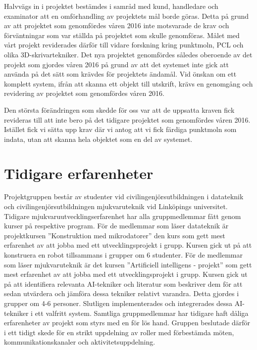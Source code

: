 Halvvägs in i projektet bestämdes i samråd med kund, handledare och examinator att en omförhandling av projektets mål borde göras. Detta på grund av att projektet som genomfördes våren 2016 inte motsvarade de krav och förväntningar som var ställda på projektet som skulle genomföras. Målet med vårt projekt reviderades därför till vidare forskning kring punktmoln, PCL och olika 3D-skrivartekniker. Det nya projektet genomfördes således oberoende av det projekt som gjordes våren 2016 på grund av att det systemet inte gick att använda på det sätt som krävdes för projektets ändamål. Vid önskan om ett komplett system, ifrån att skanna ett objekt till utskrift, krävs en genomgång och revidering av projektet som genomfördes våren 2016.

Den största förändringen som skedde för oss var att de uppsatta kraven fick revideras till att inte bero på det tidigare projektet som genomfördes våren 2016. Istället fick vi sätta upp krav där vi antog att vi fick färdiga punktmoln som indata, utan att skanna hela objektet som en del av systemet.

\section{Tidigare erfarenheter}
Projektgruppen består av studenter vid civilingenjörsutbildningen i datateknik och civilingenjörsutbildningen mjukvaruteknik vid Linköpings universitet. Tidigare mjukvaruutvecklingserfarenhet har alla gruppmedlemmar fått genom kurser på respektive program. För de medlemmar som läser datateknik är projektkursen ”Konstruktion med mikrodatorer” den kurs som gett mest erfarenhet av att jobba med ett utvecklingsprojekt i grupp. Kursen gick ut på att konstruera en robot tillsammans i grupper om 6 studenter. För de medlemmar som läser mjukvaruteknik är det kursen ”Artificiell intelligens - projekt” som gett mest erfarenhet av att jobba med ett utvecklingsprojekt i grupp. Kursen gick ut på att identifiera relevanta AI-tekniker och literatur som beskriver dem för att sedan utvärdera och jämföra dessa tekniker relativt varandra. Detta gjordes i grupper om 4-6 personer. Slutligen implementerades och integrerades dessa AI-tekniker i ett valfritt system. Samtliga gruppmedlemmar har tidigare haft dåliga erfarenheter av projekt som styrs med en för lös hand. Gruppen beslutade därför i ett tidigt skede för en strikt uppdelning av roller med förbestämda möten, kommunikationskanaler och aktivitetsuppdelning.


